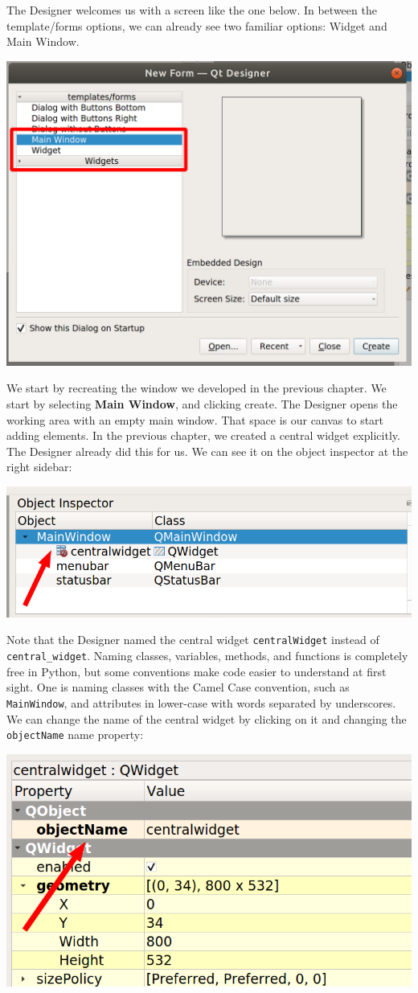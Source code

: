The Designer welcomes us with a screen like the one below. In between the template/forms options, we can already see two familiar options: Widget and Main Window.

\begin{center}
    \includegraphics[width=.5\textwidth]{images/Chapter_09/01_Designer_Welcome.png}
\end{center}

We start by recreating the window we developed in the previous chapter. We start by selecting \textbf{Main Window}, and clicking create. The Designer opens the working area with an empty main window. That space is our canvas to start adding elements. In the previous chapter, we created a central widget explicitly. The Designer already did this for us. We can see it on the object inspector at the right sidebar:

\begin{center}
    \includegraphics[width=.5\textwidth]{images/Chapter_09/02_central_widget.png}
\end{center}

Note that the Designer named the central widget \texttt{centralWidget} instead of \texttt{central\_widget}. Naming classes, variables, methods, and functions is completely free in Python, but some conventions make code easier to understand at first sight. One is naming classes with the Camel Case convention, such as \texttt{MainWindow}, and attributes in lower-case with words separated by underscores. We can change the name of the central widget by clicking on it and changing the \texttt{objectName} name property:

\begin{center}
    \includegraphics[width=.5\textwidth]{images/Chapter_09/03_central_widget_name.png}
\end{center}

